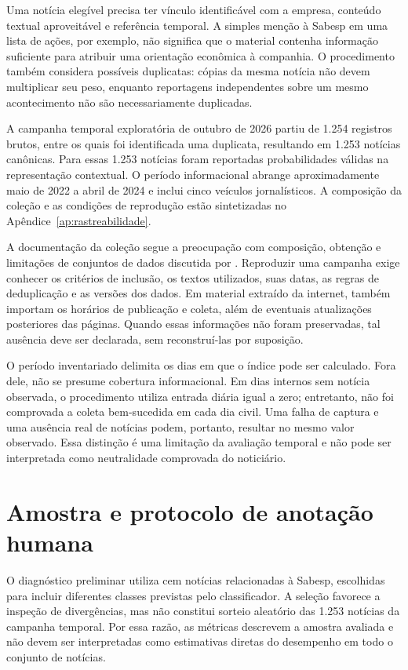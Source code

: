 Uma notícia elegível precisa ter vínculo identificável com a empresa, conteúdo textual aproveitável e referência temporal. A simples menção à Sabesp em uma lista de ações, por exemplo, não significa que o material contenha informação suficiente para atribuir uma orientação econômica à companhia. O procedimento também considera possíveis duplicatas: cópias da mesma notícia não devem multiplicar seu peso, enquanto reportagens independentes sobre um mesmo acontecimento não são necessariamente duplicadas.

A campanha temporal exploratória de outubro de 2026 partiu de 1.254 registros brutos, entre os quais foi identificada uma duplicata, resultando em 1.253 notícias canônicas. Para essas 1.253 notícias foram reportadas probabilidades válidas na representação contextual. O período informacional abrange aproximadamente maio de 2022 a abril de 2024 e inclui cinco veículos jornalísticos. A composição da coleção e as condições de reprodução estão sintetizadas no Apêndice~\ref{ap:rastreabilidade}.

A documentação da coleção segue a preocupação com composição, obtenção e limitações de conjuntos de dados discutida por . Reproduzir uma campanha exige conhecer os critérios de inclusão, os textos utilizados, suas datas, as regras de deduplicação e as versões dos dados. Em material extraído da internet, também importam os horários de publicação e coleta, além de eventuais atualizações posteriores das páginas. Quando essas informações não foram preservadas, tal ausência deve ser declarada, sem reconstruí-las por suposição.

O período inventariado delimita os dias em que o índice pode ser calculado. Fora dele, não se presume cobertura informacional. Em dias internos sem notícia observada, o procedimento utiliza entrada diária igual a zero; entretanto, não foi comprovada a coleta bem-sucedida em cada dia civil. Uma falha de captura e uma ausência real de notícias podem, portanto, resultar no mesmo valor observado. Essa distinção é uma limitação da avaliação temporal e não pode ser interpretada como neutralidade comprovada do noticiário.

\section{Amostra e protocolo de anotação humana}

O diagnóstico preliminar utiliza cem notícias relacionadas à Sabesp, escolhidas para incluir diferentes classes previstas pelo classificador. A seleção favorece a inspeção de divergências, mas não constitui sorteio aleatório das 1.253 notícias da campanha temporal. Por essa razão, as métricas descrevem a amostra avaliada e não devem ser interpretadas como estimativas diretas do desempenho em todo o conjunto de notícias.

